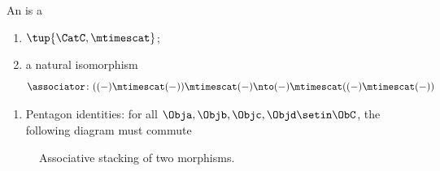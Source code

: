 \begin{ctdefinition}
    \label{def:assoc-stacking-cat}
    An  is a \

    \constit
    \begin{enumerate}
        \item {} $\tup{\CatC, \mtimescat}$;
        \item a natural isomorphism
              \begin{equation}
                  \associator \colon (( - ) \mtimescat ( - )) \mtimescat ( - ) \nto ( - ) \mtimescat (( - ) \mtimescat ( - ))
              \end{equation}
    \end{enumerate}

    \condit
    \begin{enumerate}
        \item Pentagon identities: for all $\Obja,\Objb,\Objc,\Objd\setin \ObC$, the following diagram must commute
    \end{enumerate}
\end{ctdefinition}



\begin{marginfigure}[]
    \centering
    \caption{Associative stacking of three morphisms, in one order.}
    \label{fig:associative-stacking-1-new}
\end{marginfigure}

\begin{marginfigure}
    \centering
    \caption{Associative stacking of three morphisms, in another order.}
    \label{fig:associative-stacking-2-new}
\end{marginfigure}

\begin{marginfigure}
    \centering
    \caption{Our string diagram notation for a triple stack.}
    \label{fig:triple-stacked-duplicate}
\end{marginfigure}

\begin{figure}[h!]
    \centering
    \caption{Associative stacking of two morphisms.}
    \label{fig:double-stacked-new-duplicate}
\end{figure}


